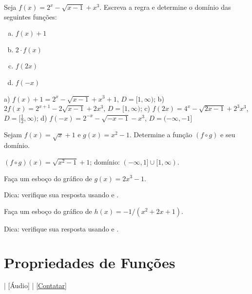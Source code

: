 \begin{exer}
  Seja $f(x) = 2^x - \sqrt{x-1} + x^3$. Escreva a regra e determine o domínio das seguintes funções:
  \begin{enumerate}[a)]
  \item $f(x) + 1$
  \item $2\cdot f(x)$
  \item $f(2x)$
  \item $f(-x)$
  \end{enumerate}
\end{exer}
\begin{resp}
  a) $f(x)+1 = 2^x - \sqrt{x-1} + x^3 + 1$, $D=[1,\infty)$; b) $2f(x) = 2^{x+1} - 2\sqrt{x-1} + 2x^3$, $D=[1,\infty)$; c) $f(2x)=4^x-\sqrt{2x-1}+2^3x^3$, $D=[\frac{1}{2},\infty)$; d) $f(-x)=2^{-x}-\sqrt{-x-1}-x^3$, $D=(-\infty, -1]$ 
\end{resp}

\begin{exer}
  Sejam $f(x) = \sqrt{x}+1$ e $g(x) = x^2 -1$. Determine a função $(f\circ g)$ e seu domínio.
\end{exer}
\begin{resp}
  $(f\circ g)(x) = \sqrt{x^2-1}+1$; domínio: $(-\infty, 1]\cup [1, \infty)$.
\end{resp}

\begin{exer}
  Faça um esboço do gráfico de $g(x) = 2x^3 - 1$.
\end{exer}
\begin{resp}
  \ifispython
  Dica: verifique sua resposta usando {\python} e {\sympy}.
  \fi
\end{resp}

\begin{exer}
  Faça um esboço do gráfico de $h(x)=-1/(x^2+2x+1)$.
\end{exer}
\begin{resp}
  \ifispython
  Dica: verifique sua resposta usando {\python} e {\sympy}.
  \fi
\end{resp}

\section{Propriedades de Funções}\label{cap_funcao_sec_funprop}

\begin{flushright}
  [Vídeo] | [Áudio] | \href{https://phkonzen.github.io/notas/contato.html}{[Contatar]}
\end{flushright}

